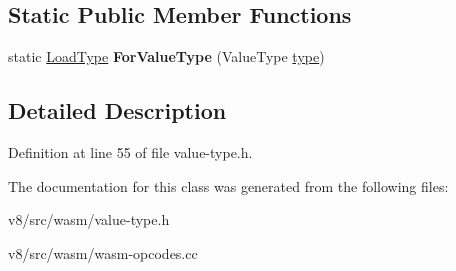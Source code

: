 \subsection*{Static Public Member Functions}
\begin{DoxyCompactItemize}
\item 
\mbox{\label{classv8_1_1internal_1_1wasm_1_1LoadType_a54257ba665f6b21cb39a6396f5423279}} 
static \mbox{\hyperlink{classv8_1_1internal_1_1wasm_1_1LoadType}{Load\+Type}} {\bfseries For\+Value\+Type} (Value\+Type \mbox{\hyperlink{classstd_1_1conditional_1_1type}{type}})
\end{DoxyCompactItemize}


\subsection{Detailed Description}


Definition at line 55 of file value-\/type.\+h.



The documentation for this class was generated from the following files\+:\begin{DoxyCompactItemize}
\item 
v8/src/wasm/value-\/type.\+h\item 
v8/src/wasm/wasm-\/opcodes.\+cc\end{DoxyCompactItemize}
